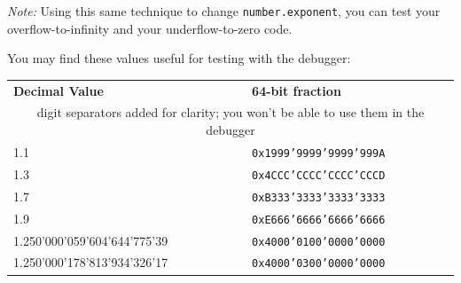 \textit{Note: } Using this same technique to change \lstinline{number.exponent}, you can test your overflow-to-infinity and your underflow-to-zero code.

You may find these values useful for testing with the debugger:

\vspace{1cm}

\begin{tabular}[h]{ll}
    \textbf{Decimal Value}          & \textbf{64-bit fraction} \\
    \multicolumn{2}{c}{digit separators added for clarity; you won't be able to use them in the debugger} \\
    1.1                             & \texttt{0x1999'9999'9999'999A} \\
    1.3                             & \texttt{0x4CCC'CCCC'CCCC'CCCD} \\
    1.7                             & \texttt{0xB333'3333'3333'3333} \\
    1.9                             & \texttt{0xE666'6666'6666'6666} \\
    1.250'000'059'604'644'775'39    & \texttt{0x4000'0100'0000'0000} \\
    1.250'000'178'813'934'326'17    & \texttt{0x4000'0300'0000'0000}
\end{tabular}